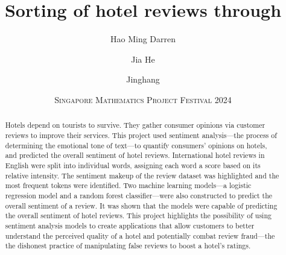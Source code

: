 \documentclass[12pt, a4paper]{pancake-article}
\title{Sorting \tint{sentiments} of hotel reviews through \tint{machine learning}}
\author{\tint{Yap} Hao Ming Darren \and \tint{Tan} Jia He \and \tint{Fu} Jinghang}
\date{\scshape Singapore Mathematics Project Festival 2024}
\begin{document}
\maketitle
\begin{abstract}
	Hotels depend on tourists to survive. They gather consumer opinions via customer
	reviews to improve their services. This project used sentiment analysis---the
	process of determining the emotional tone of text---to quantify consumers'
	opinions on hotels, and predicted the overall sentiment of hotel reviews.
	International hotel reviews in English were split into individual words,
	assigning each word a score based on its relative intensity. The sentiment
	makeup of the review dataset was highlighted and the most frequent tokens were
	identified. Two machine learning models---a logistic regression model and a random
	forest classifier---were also constructed to predict the overall sentiment of a
	review. It was shown that the models were capable of predicting the overall
	sentiment of hotel reviews. This project highlights the possibility of using
	sentiment analysis models to create applications that allow customers to better
	understand the perceived quality of a hotel and potentially combat review fraud---the
	the dishonest practice of manipulating false reviews to boost a hotel's ratings.
\end{abstract}
\end{document}
